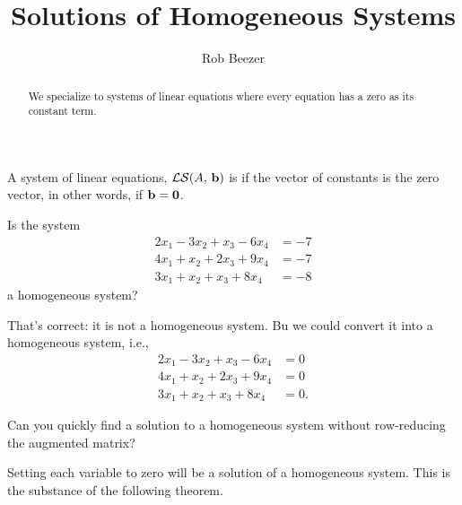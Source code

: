 \documentclass{ximera}
\author{Rob Beezer}
\title{Solutions of Homogeneous Systems}
\begin{document}
\begin{abstract}
  We specialize to systems of linear equations where every equation
  has a zero as its constant term.
\end{abstract}
\maketitle

\begin{definition}
  A system of linear equations, $\mathcal{LS}\!\left(A,\,\mathbf{b}\right)$ is
   if the vector of constants is the zero vector, in
  other words, if $\mathbf{b}=\mathbf{0}$.
\end{definition}

\begin{example}
  Is the system
  \begin{align*}
    2x_1  - 3x_2 + x_3 - 6x_4 &= -7 \\
    4x_1 +x_2 +2x_3 + 9x_4 &=  -7 \\
    3x_1 +x_2 +x_3 + 8x_4 &=  -8
  \end{align*}
  a homogeneous system?

  \begin{multipleChoice}
  \end{multipleChoice}

  \begin{feedback}[correct]
    That's correct: it is not a homogeneous system.  Bu we could convert it into a homogeneous system, i.e.,
    \begin{align*}
      2x_1  - 3x_2 + x_3 - 6x_4 &= 0 \\
      4x_1 +x_2 +2x_3 + 9x_4 &=  0 \\
      3x_1 +x_2 +x_3 + 8x_4 &=  0.
    \end{align*}
  \end{feedback}
\end{example}

\begin{question}
  Can you quickly find a solution to a homogeneous system without row-reducing the augmented matrix?

  \begin{multipleChoice}
  \end{multipleChoice}

  \begin{question}
    Setting each variable to zero will
     be a solution
    of a homogeneous system.  This is the substance of the following
    theorem.
  \end{question}
\end{question}
\end{document}
